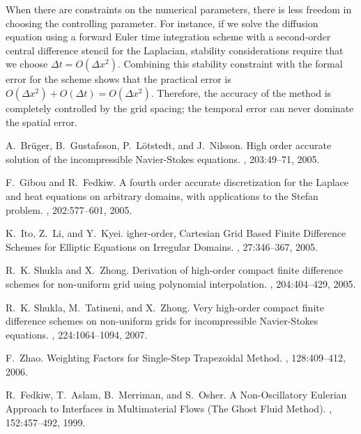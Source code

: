 \documentclass[fleqn,12pt,twoside]{article}
\def\dt{\Delta t}
\def\dx{\Delta x}
\begin{document}
When there are constraints on the numerical parameters, there is less freedom 
in choosing the controlling parameter.  For instance, if we solve the 
diffusion equation using a forward Euler time integration scheme with a 
second-order central difference stencil for the Laplacian, stability
considerations require that we choose $\dt = O(\dx^2)$.  
Combining this stability constraint with the formal error for the scheme
shows that the practical error is 
$O(\dx^2) + O(\dt) = O(\dx^2)$.  Therefore, the accuracy of the 
method is completely controlled by the grid spacing; the temporal error can 
never dominate the spatial error.


%

\begin{thebibliography}{10}

A.~Br\"uger, B.~Gustafsson, P.~L\"otstedt, and J.~Nilsson.
\newblock High order accurate solution of the incompressible {N}avier-{S}tokes
  equations.
, 203:49--71, 2005.

F.~Gibou and R.~Fedkiw.
\newblock A fourth order accurate discretization for the {L}aplace and heat
  equations on arbitrary domains, with applications to the {S}tefan problem.
, 202:577--601, 2005.

K.~Ito, Z.~Li, and Y.~Kyei.
igher-order, {C}artesian {G}rid {B}ased {F}inite {D}ifference
  {S}chemes for {E}lliptic {E}quations on {I}rregular {D}omains.
, 27:346--367, 2005.

R.~K. Shukla and X.~Zhong.
\newblock Derivation of high-order compact finite difference schemes for
  non-uniform grid using polynomial interpolation.
, 204:404--429, 2005.

R.~K. Shukla, M.~Tatineni, and X.~Zhong.
\newblock Very high-order compact finite difference schemes on non-uniform
  grids for incompressible {N}avier-{S}tokes equations.
, 224:1064--1094, 2007.

F.~Zhao.
\newblock Weighting {F}actors for {S}ingle-{S}tep {T}rapezoidal {M}ethod.
, 128:409--412, 2006.

R.~Fedkiw, T.~Aslam, B.~Merriman, and S.~Osher.
\newblock A {N}on-{O}scillatory {E}ulerian {A}pproach to {I}nterfaces in
  {M}ultimaterial {F}lows ({T}he {G}host {F}luid {M}ethod).
, 152:457--492, 1999.


\end{thebibliography}
\end{document}
